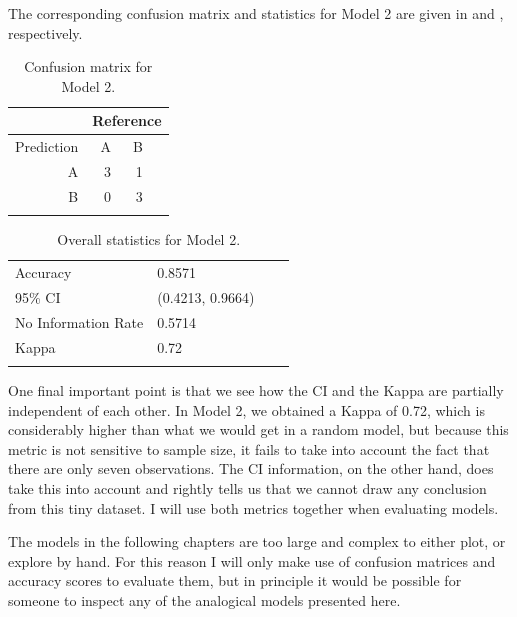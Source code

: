 The corresponding confusion matrix and statistics for Model 2 are given in  and , respectively.

\begin{table}[!htpb]
  \centering
  \begin{tabular}{rrrr}
    \lsptoprule
               & \multicolumn{3}{c}{Reference} \\
    \midrule
    Prediction & A  & B                        \\
    A          & 3  & 1                        \\
    B          & 0  & 3                        \\
    \lspbottomrule
  \end{tabular}
  \caption{Confusion matrix for Model 2.}\label{tab:model2-conf}
\end{table}

\begin{table}[!htpb]
  \centering
  \begin{tabular}{llrr}
    \lsptoprule
    \multicolumn{2}{c}{Overall statistics:} \\

    \midrule
    Accuracy            & 0.8571            \\
    95\% CI             & (0.4213, 0.9664)  \\
    No Information Rate & 0.5714            \\
    Kappa               & 0.72              \\
    \lspbottomrule
  \end{tabular}
  \caption{Overall statistics for Model 2.}\label{tab:stats-model2}
\end{table}

One final important point is that we see how the CI and the Kappa are partially independent of each other. In Model 2, we obtained a Kappa of 0.72, which is considerably higher than what we would get in a random model, but because this metric is not sensitive to sample size, it fails to take into account the fact that there are only seven observations. The CI information, on the other hand, does take this into account and rightly tells us that we cannot draw any conclusion from this tiny dataset. I will use both metrics together when evaluating models.

The models in the following chapters are too large and complex to either plot, or explore by hand. For this reason I will only make use of confusion matrices and accuracy scores to evaluate them, but in principle it would be possible for someone to inspect any of the analogical models presented here.

